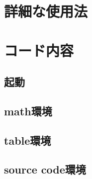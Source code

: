 \appendix
\section{詳細な使用法}

\pagebreak
\section{コード内容}
\subsection{起動}

\pagebreak
\subsection{math環境}

\pagebreak
\subsection{table環境}

\pagebreak
\subsection{source code環境}

\pagebreak
